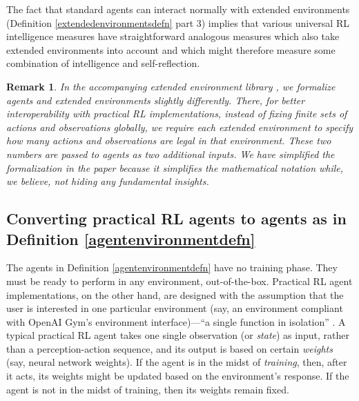 \documentclass{article}
\newtheorem{myremark}[mytheorem]{Remark}
\begin{document}
The fact that standard agents can interact normally with extended environments
(Definition \ref{extendedenvironmentsdefn} part 3) implies that various universal
RL intelligence measures
\cite{goertzel2006patterns} \cite{hernandez} \cite{gavane} \cite{legg2007universal}
have straightforward analogous measures which also take
extended environments into account and which might therefore measure some combination
of intelligence and self-reflection.

\begin{myremark}
  In the accompanying extended environment library \cite{library}, we formalize agents
  and extended environments slightly differently. There, for better interoperability
  with practical RL implementations, instead of fixing finite
  sets of actions and observations globally, we require each extended environment
  to specify how many actions and observations are legal in that environment.
  These two numbers are passed to agents as two additional inputs.
  We have simplified the formalization in the paper because it simplifies
  the mathematical notation while, we believe, not hiding any fundamental insights.
\end{myremark}

\subsection{Converting practical RL agents to agents as in
Definition \ref{agentenvironmentdefn}}
\label{mappingtouniversalsection}

The agents in Definition \ref{agentenvironmentdefn} have no training phase. They must be
ready to perform in any environment, out-of-the-box. Practical RL agent implementations,
on the other hand, are designed with the assumption that the user is interested in one
particular environment (say, an environment compliant with OpenAI Gym's
environment interface)---``a single function in isolation'' \cite{thrun1998lifelong}.
A typical practical RL agent takes one single observation (or
\emph{state}) as input, rather than a perception-action sequence, and its output is based
on certain \emph{weights} (say, neural network weights). If the agent is in the midst of
\emph{training}, then, after it acts, its weights might be updated based on the environment's
response. If the agent is not in the midst of training, then its weights remain fixed.
\end{document}
